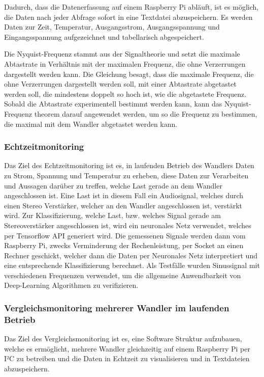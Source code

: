 Dadurch, dass die Datenerfassung auf einem Raspberry Pi abläuft, ist es möglich, die Daten nach jeder Abfrage sofort in eine Textdatei abzuspeichern. Es werden Daten zur Zeit, Temperatur, Ausgangsstrom, Ausgangsspannung und Eingangsspannung aufgezeichnet und tabellarisch abgespeichert.

Die Nyquist-Frequenz stammt aus der Signaltheorie und setzt die maximale Abtastrate in Verhältnis mit der maximalen Frequenz, die ohne Verzerrungen dargestellt werden kann. Die Gleichung besagt, dass die maximale Frequenz, die ohne Verzerrungen dargestellt werden soll, mit einer Abtastrate abgetastet werden soll, die mindestens doppelt so hoch ist, wie die abgetastete Frequenz. Sobald die Abtastrate experimentell bestimmt werden kann, kann das Nyquist-Frequenz theorem darauf angewendet werden, um so die Frequenz zu bestimmen, die maximal mit dem Wandler abgetastet werden kann. 


\subsubsection{Echtzeitmonitoring}
Das Ziel des Echtzeitmonitoring ist es, in laufenden Betrieb des Wandlers Daten zu Strom, Spannung und Temperatur zu erheben, diese Daten zur Verarbeiten und Aussagen darüber zu treffen, welche Last gerade an dem Wandler angeschlossen ist. Eine Last ist in diesem Fall ein Audiosignal, welches durch einen Stereo Verstärker, welcher an den Wandler angeschlossen ist, verstärkt wird. 
Zur Klassifizierung, welche Last, bzw. welches Signal gerade am Stereoverstärker angeschlossen ist, wird ein neuronales Netz verwendet, welches per Tensorflow API generiert wird. Die gemessenen Signale werden dann vom Raspberry Pi, zwecks Verminderung der Rechenleistung, per Socket an einen Rechner geschickt, welcher dann die Daten per Neuronales Netz interpretiert und eine entsprechende Klassifizierung berechnet. Als Testfälle wurden Sinussignal mit verschiedenen Frequenzen verwendet, um die allgemeine Anwendbarkeit von Deep-Learning Algorithmen zu verifizieren. 

\subsubsection{Vergleichsmonitoring mehrerer Wandler im laufenden Betrieb}
Das Ziel des Vergleichsmonitoring ist es, eine Software Struktur aufzubauen, welche es ermöglicht, mehrere Wandler gleichzeitig auf einem Raspberry Pi per I²C zu betreiben und die Daten in Echtzeit zu visualisieren und in Textdateien abzuspeichern. 
 
